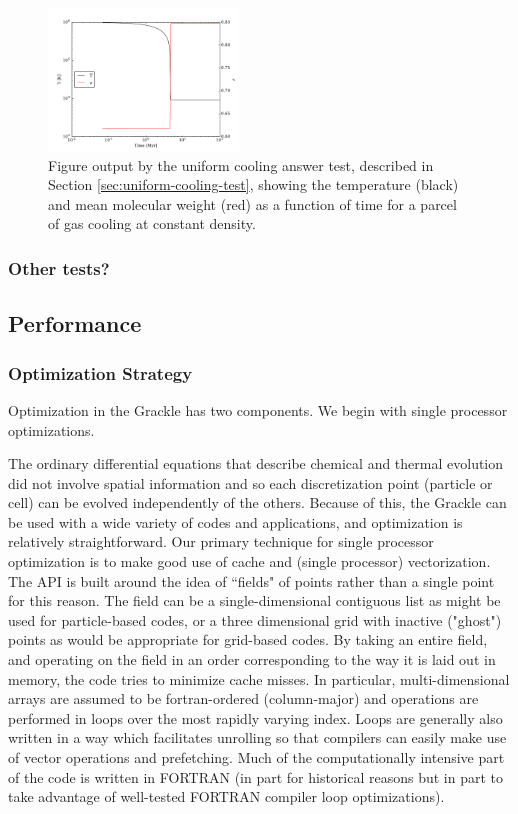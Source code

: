 \begin{figure}
  \centering
  \includegraphics[width=0.45\textwidth]{cooling_cell.pdf}
  \caption{
    Figure output by the uniform cooling answer test, described in
    Section \ref{sec:uniform-cooling-test}, showing the temperature
    (black) and mean molecular weight (red) as a function of time for
    a parcel of gas cooling at constant density.
  } \label{fig:uniform-cooling-test}
\end{figure}

\subsubsection{Other tests?}


\subsection{Performance}


\subsubsection{Optimization Strategy}

Optimization in the Grackle has two components.  We begin with single processor optimizations.  

The ordinary differential equations that describe chemical and thermal evolution did not involve spatial information and so each discretization point (particle or cell) can be evolved independently of the others.  Because of this, the Grackle can be used with a wide variety of codes and applications, and optimization is relatively straightforward.  Our primary technique for single processor optimization is to make good use of cache and (single processor) vectorization.  The API is built around the idea of ``fields" of points rather than a single point for this reason.  The field can be a single-dimensional contiguous list as might be used for particle-based codes, or a three dimensional grid with inactive ("ghost") points as would be appropriate for grid-based codes.  By taking an entire field, and operating on the field in an order corresponding to the way it is laid out in memory, the code tries to minimize cache misses.  In particular, multi-dimensional arrays are assumed to be fortran-ordered (column-major) and operations are performed in loops over the most rapidly varying index.  Loops are generally also written in a way which facilitates unrolling so that compilers can easily make use of vector operations and prefetching.  Much of the computationally intensive part of the code is written in FORTRAN (in part for historical reasons but in part to take advantage of well-tested FORTRAN compiler loop optimizations).

